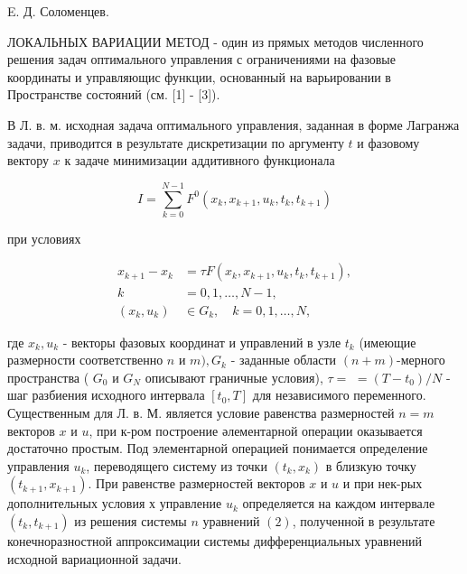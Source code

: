 \documentclass[10pt]{article}
\begin{document}
E. Д. Соломенцев.



ЛОКАЛЬНЫХ ВАРИАЦИИ МЕТОД - один из прямых методов численного решения задач оптимального управления с ограничениями на фазовые координаты и управляющис функции, основанный на варьировании в Пространстве состояний (см. [1] - [3]).



В Л. в. м. исходная задача оптимального управления, заданная в форме Лагранжа задачи, приводится в результате дискретизации по аргументу $t$ и фазовому вектору $x$ к задаче минимизации аддитивного функционала



\[

I=\sum_{k=0}^{N-1} F^{0}\left(x_{k}, x_{k+1}, u_{k}, t_{k}, t_{k+1}\right)

\]



при условиях



\[

\begin{aligned}

x_{k+1}-x_{k} & =\tau F\left(x_{k}, x_{k+1}, u_{k}, t_{k}, t_{k+1}\right), \\

k & =0,1, \ldots, N-1, \\

\left(x_{k}, u_{k}\right) & \in G_{k}, \quad k=0,1, \ldots, N,

\end{aligned}

\]



где $x_{k}, u_{k}$ - векторы фазовых координат и управлений в узле $t_{k}$ (имеющие размерности соответственно $n$ и $m), G_{k}$ - заданные области $(n+m)$-мерного пространства ( $G_{0}$ и $G_{N}$ описывают граничные условия), $\tau=$ $=\left(T-t_{0}\right) / N$ - шаг разбиения исходного интервала $\left[t_{0}, T\right]$ для независимого переменного. Существенным для Л. в. М. является условие равенства размерностей $n=m$ векторов $x$ и $u$, при к-ром построение әлементарной операции оказывается достаточно простым. Под элементарной операцией понимается определение управления $u_{k}$, переводящего систему из точки $\left(t_{k}, x_{k}\right)$ в близкую точку $\left(t_{k+1}, x_{k+1}\right)$. При равенстве размерностей векторов $x$ и $u$ и при нек-рых дополнительных условия х управление $u_{k}$ определяется на каждом интервале $\left(t_{k}, t_{k+1}\right)$ из решения системы $n$ уравнений $(2)$, полученной в результате конечноразностной аппроксимации системы дифференциальных уравнений исходной вариационной задачи.
\end{document}
